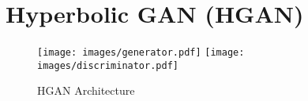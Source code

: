 \documentclass[journal]{IEEEtran}
\begin{document}
\begin{comment}
The StyleGAN architecture is a new GAN approach where the generator is modified based on the style transfer literature \cite{stylegan}. The generator has an additional network for style learning called the mapping network, and it maps the input noise to a new latent space . The samples of this new latent space or styles are entered into the generator network through AdaIN layers \cite{adain}, which are frequently used in style transfer literature. This new approach allows separate the stochastic effect. In the first one, the style indicates the high-level abstracts features for the generated image. For example, if the generator works on the LSUN cats dataset \cite{lsun}, the style indicates that the image is the orange cat. In the second one, inside the generator network, the algorithm injects noise to modeling the stochastic variation like freckles, hair, and skin pores. The StyleGAN train procedure is base on Progressive GAN \cite{progressive}, where the loss is similar to WGAN. However, it uses the softplus function in the discriminator output \cite{softplus} and uses R1 regularization \cite{R1} in the discriminator and Path length regularization the generator \cite{stylegan}. 















[\mathcal{D}(\mathcal{G}(\mathbf{z}))] 







Where  is the output of the mapping network,  is normal noise, , and  is the moving average. The same authors of StyleGAN analyze the performance and the configuration to improve the architecture \cite{stylegan2}. They pulled the AdaIN layer and directly modulated the convolution kernels with style before doing convolution operation, then they do not implement the progressive growing. Furthermore, they apply the regularization terms every 8 and 16 iterations for R1 and path length, respectively, called lazy regularization. Finally, they test the skip connections and residual networks for the configuration of the generator network.

\end{comment}
 
\section{Hyperbolic GAN (HGAN)}
\begin{figure*}[t]
    \centering
     {\texttt{[image: images/generator.pdf]}}
        {\texttt{[image: images/discriminator.pdf]}}
\caption{HGAN Architecture}
\label{fig:arch}
\end{figure*}
\end{document}
